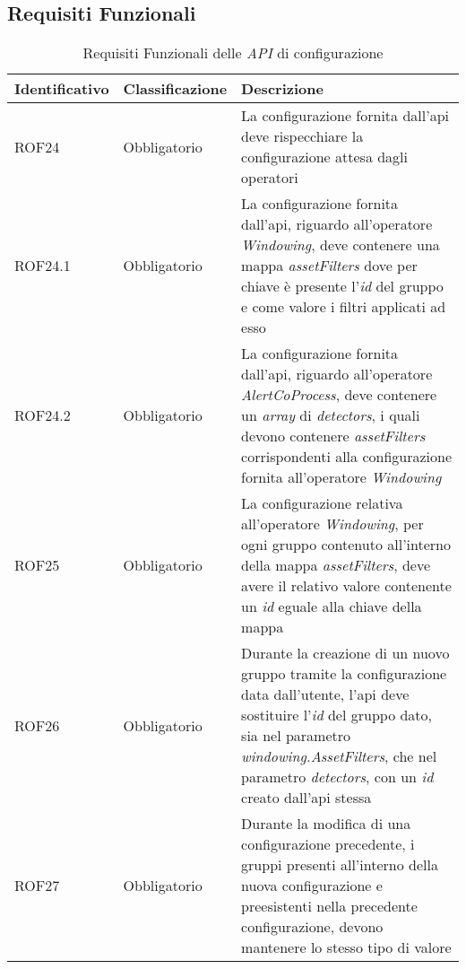 \subsection{Requisiti Funzionali}
{
\centering
\begin{longtable}{L{3cm} L{3cm} L{7.5cm}}
\caption{Requisiti Funzionali delle \textit{API} di configurazione}\\
\textbf{Identificativo} &
\textbf{Classificazione}&
\textbf{Descrizione}\\
\endhead
\hline
ROF24 & Obbligatorio & La configurazione fornita dall'\gls{api} deve rispecchiare la configurazione attesa dagli operatori\\
\hline
ROF24.1 & Obbligatorio & La configurazione fornita dall'\gls{api}, riguardo all'operatore \textit{Windowing}, deve contenere una mappa \textit{assetFilters} dove per chiave è presente l'\textit{id} del gruppo e come valore i filtri applicati ad esso\\
\hline
ROF24.2 & Obbligatorio & La configurazione fornita dall'\gls{api}, riguardo all'operatore \textit{AlertCoProcess}, deve contenere un \textit{array} di \textit{detectors}, i quali devono contenere \textit{assetFilters} corrispondenti alla configurazione fornita all'operatore \textit{Windowing}\\
\hline
ROF25 & Obbligatorio & La configurazione relativa all'operatore \textit{Windowing}, per ogni gruppo contenuto all'interno della mappa \textit{assetFilters}, deve avere il relativo valore contenente un \textit{id} eguale alla chiave della mappa\\
\hline
ROF26 & Obbligatorio & Durante la creazione di un nuovo gruppo tramite la configurazione data dall'utente, l'\gls{api} deve sostituire l'\textit{id} del gruppo dato, sia nel parametro \textit{windowing.AssetFilters}, che nel parametro \textit{detectors}, con un \textit{id} creato dall'\gls{api} stessa\\
\hline
ROF27 & Obbligatorio & Durante la modifica di una configurazione precedente, i gruppi presenti all'interno della nuova configurazione e preesistenti nella precedente configurazione, devono mantenere lo stesso tipo di valore\\
\hline
\end{longtable}
}

